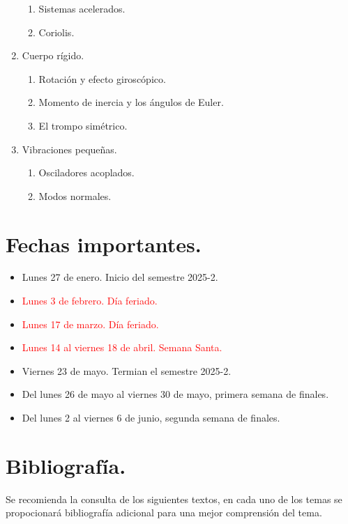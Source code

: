 \documentclass[hidelinks,12pt]{article}
\begin{document}
\begin{enumerate}
\begin{enumerate}
    \item Sistemas acelerados.
    \item Coriolis.
\end{enumerate}
\item Cuerpo rígido.
\begin{enumerate}
    \item Rotación y efecto giroscópico.
    \item Momento de inercia y los ángulos de Euler.
    \item El trompo simétrico.
\end{enumerate}
\item Vibraciones pequeñas.
\begin{enumerate}
    \item Osciladores acoplados.
    \item Modos normales.
\end{enumerate}
\end{enumerate}

\section{Fechas importantes.}

\begin{itemize}
\setlength\itemsep{1pt}
\item Lunes 27 de enero. Inicio del semestre 2025-2.
\item \textcolor{red}{Lunes 3 de febrero. Día feriado.}
\item \textcolor{red}{Lunes 17 de marzo. Día feriado.}
\item \textcolor{red}{Lunes 14 al viernes 18 de abril. Semana Santa.}
\item Viernes 23 de mayo. Termian el semestre 2025-2.
\item Del lunes 26 de mayo al viernes 30 de mayo, primera semana de finales.
\item Del lunes 2 al viernes 6 de junio, segunda semana de finales.
\end{itemize}

\section{Bibliografía.}

Se recomienda la consulta de los siguientes textos, en cada uno de los temas se propocionará bibliografía adicional para una mejor comprensión del tema.
\nocite{*}
\printbibliography
\end{document}
